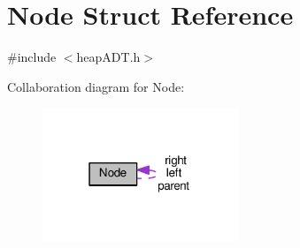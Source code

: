 \hypertarget{structNode}{}\section{Node Struct Reference}
\label{structNode}


{\ttfamily \#include $<$heap\+A\+D\+T.\+h$>$}



Collaboration diagram for Node\+:
\nopagebreak
\begin{figure}[H]
\begin{center}
\leavevmode
\includegraphics[width=166pt]{structNode__coll__graph}
\end{center}
\end{figure}
